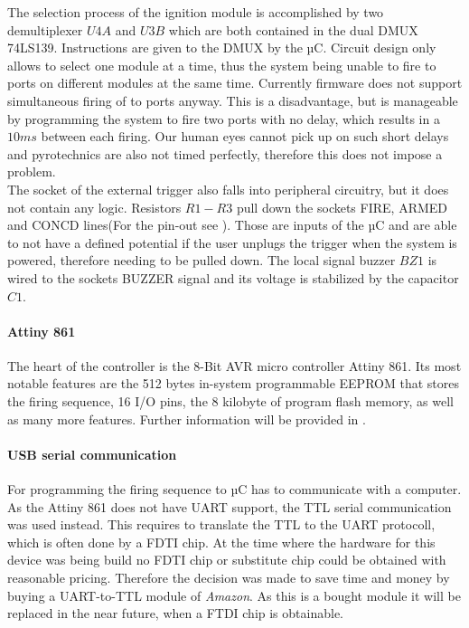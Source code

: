 \noindent The selection process of the ignition module is accomplished by two demultiplexer $U4A$ and $U3B$ which are both contained in the dual DMUX 74LS139. Instructions are given to the DMUX by the µC. Circuit design only allows to select one module at a time, thus the system being unable to fire to ports on different modules at the same time. Currently firmware does not support simultaneous firing of to ports anyway. This is a disadvantage, but is manageable by programming the system to fire two ports with no delay, which results in a $10ms$ between each firing. Our human eyes cannot pick up on such short delays and pyrotechnics are also not timed perfectly, therefore this does not impose a problem.\\

\noindent The socket of the external trigger also falls into peripheral circuitry, but  it does not contain any logic. Resistors $R1-R3$ pull down the sockets FIRE, ARMED and CONCD lines(For the pin-out see ). Those are inputs of the µC and are able to not have a defined potential if the user unplugs the trigger when the system is powered, therefore needing to be pulled down. The local signal buzzer $BZ1$ is wired to the sockets BUZZER signal and its voltage is stabilized by the capacitor $C1$.\\

\paragraph{Attiny 861}
The heart of the controller is the 8-Bit AVR micro controller Attiny 861. Its most notable features are the 512 bytes in-system programmable EEPROM that stores the firing sequence, 16 I/O pins, the 8 kilobyte of program flash memory, as well as many more features. Further information will be provided in .


\paragraph{USB serial communication}
For programming the firing sequence to µC has to communicate with a computer. As the Attiny 861 does not have UART support, the TTL serial communication was used instead. This requires to translate the TTL to the UART protocoll, which is often done by a FDTI chip. At the time where the hardware for this device was being build no FDTI chip or substitute chip could be obtained with reasonable pricing. Therefore the decision was made to save time and money by buying a UART-to-TTL module of \textit{Amazon}. As this is a bought module it will be replaced in the near future, when a FTDI chip is obtainable. \\

